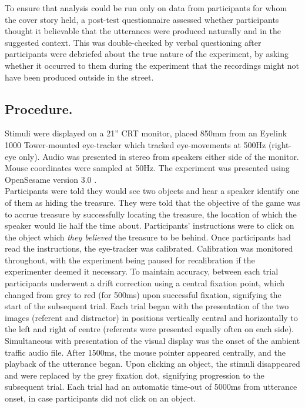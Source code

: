 \documentclass[man]{apa6}
\begin{document}
To ensure that analysis could be run only on data from participants for whom the cover story held, a post-test questionnaire assessed whether participants thought it believable that the utterances were produced naturally and in the suggested context. 
This was double-checked by verbal questioning after participants were debriefed about the true nature of the experiment, by asking whether it occurred to them during the experiment that the recordings might not have been produced outside in the street.\\

\subsection{Procedure.}
Stimuli were displayed on a 21'' CRT monitor, placed 850mm from an Eyelink 1000 Tower-mounted eye-tracker which tracked eye-movements at 500Hz (right-eye only). 
Audio was presented in stereo from speakers either side of the monitor. 
Mouse coordinates were sampled at 50Hz. 
The experiment was presented using OpenSesame version 3.0 \citep{Mathot2012}.\\

Participants were told they would see two objects and hear a speaker identify one of them as hiding the treasure. 
They were told that the objective of the game was to accrue treasure by successfully locating the treasure, the location of which the speaker would lie half the time about. Participants' instructions were to click on the object which \textit{they believed} the treasure to be behind. 
Once participants had read the instructions, the eye-tracker was calibrated.
Calibration was monitored throughout, with the experiment being paused for recalibration if the experimenter deemed it necessary.
To maintain accuracy, between each trial participants underwent a drift correction using a central fixation point, which changed from grey to red (for 500ms) upon successful fixation, signifying the start of the subsequent trial. 
Each trial began with the presentation of the two images (referent and distractor) in positions vertically central and horizontally to the left and right of centre (referents were presented equally often on each side). 
Simultaneous with presentation of the visual display was the onset of the ambient traffic audio file. 
After 1500ms, the mouse pointer appeared centrally, and the playback of the utterance began. 
Upon clicking an object, the stimuli disappeared and were replaced by the grey fixation dot, signifying progression to the subsequent trial. 
Each trial had an automatic time-out of 5000ms from utterance onset, in case participants did not click on an object.\\
\end{document}
